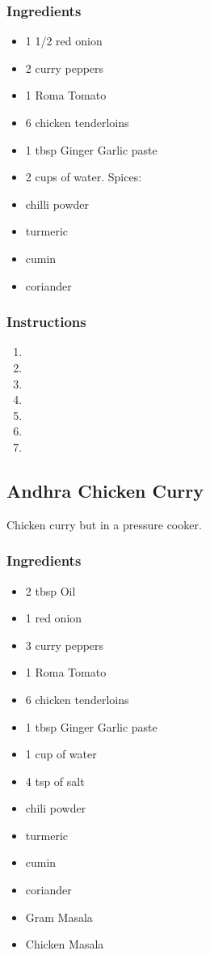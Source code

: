 \documentclass[11pt]{article}
\begin{document}
\subsubsection*{Ingredients}
\label{sec:org84a23bc}
\begin{itemize}
\item 1 1/2 red onion
\item 2 curry peppers
\item 1 Roma Tomato
\item 6 chicken tenderloins
\item 1 tbsp Ginger Garlic paste
\item 2 cups of water.
Spices:
\item chilli powder
\item turmeric
\item cumin
\item coriander
\end{itemize}
\subsubsection*{Instructions}
\label{sec:orgafec118}
\begin{enumerate}
\item 

\item 

\item 

\item 

\item 

\item 

\item 
\end{enumerate}
\subsection{Andhra Chicken Curry}
\label{sec:org0e5748b}
Chicken curry but in a pressure cooker.
\subsubsection*{Ingredients}
\label{sec:org6817e21}
\begin{itemize}
\item 2 tbsp Oil
\item 1 red onion
\item 3 curry peppers
\item 1 Roma Tomato
\item 6 chicken tenderloins
\item 1 tbsp Ginger Garlic paste
\item 1 cup of water
\item 4 tsp of salt
\item chili powder
\item turmeric
\item cumin
\item coriander
\item Gram Masala
\item Chicken Masala
\end{itemize}
\end{document}
